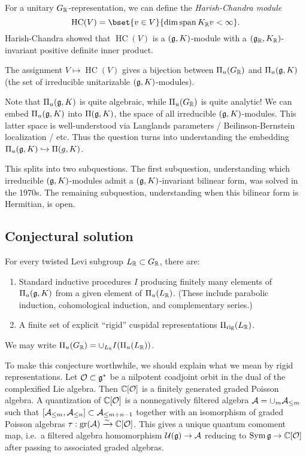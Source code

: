 \documentclass{article}
\begin{document}
For a unitary $G_{\mathbb{R}}$-representation, we can define the \emph{Harish-Chandra module}
\[
	\operatorname{HC}(V) = \bset{v \in V}{\dim \spanop K_\RR v < \infty}.
\]
Harish-Chandra showed that $\operatorname{HC}(V)$ is a $(\mathfrak{g}, K)$-module with a $(\mathfrak{g}_{\mathbb{R}}, K_{\mathbb{R}})$-invariant positive definite inner product.

\begin{thm}
	The assignment $V \mapsto \operatorname{HC}(V)$ gives a bijection between $\Pi_u(G_{\mathbb{R}})$ and $\Pi_u(\mathfrak{g}, K)$ (the set of irreducible unitarizable $(\mathfrak{g}, K)$-modules).
\end{thm}

Note that $\Pi_u(\mathfrak{g}, K)$ is quite algebraic, while $\Pi_u(G_{\mathbb{R}})$ is quite analytic!
We can embed $\Pi_u(\mathfrak{g}, K)$ into $\Pi(\mathfrak{g}, K)$, the space of all irreducible $(\mathfrak{g}, K)$-modules.
This latter space is well-understood via Langlands parameters / Beilinson-Bernstein localization / etc.
Thus the question turns into understanding the embedding $\Pi_u(\mathfrak{g}, K) \hookrightarrow \Pi(g, K)$.

This splits into two subquestions.
The first subquestion, understanding which irreducible $(\mathfrak{g}, K)$-modules admit a $(\mathfrak{g}, K)$-invariant bilinear form, was solved in the 1970s.
The remaining subquestion, understanding when this bilinear form is Hermitian, is open.

\subsection{Conjectural solution}

\begin{conj}
	For every twisted Levi subgroup $L_{\mathbb{R}} \subset G_{\mathbb{R}}$, there are:
	\begin{enumerate}
		\item Standard inductive procedures $I$ producing finitely many elements of $\Pi_u(\mathfrak{g}, K)$ from a given element of $\Pi_u(L_{\mathbb{R}})$.
			(These include parabolic induction, cohomological induction, and complementary series.)
		\item A finite set of explicit ``rigid'' cuspidal representations $\Pi_{\mathrm{rig}}(L_{\mathbb{R}})$.
	\end{enumerate}
	We may write $\Pi_u(G_{\mathbb{R}}) = \cup_{L_{\mathbb{R}}} I(\Pi_u(L_{\mathbb{R}}))$.
\end{conj}

To make this conjecture worthwhile, we should explain what we mean by rigid representations.
Let $\mathcal{O} \subset \mathfrak{g}^*$ be a nilpotent coadjoint orbit in the dual of the complexified Lie algebra.
Then $\mathbb{C}[\mathcal{O}]$ is a finitely generated graded Poisson algebra.
A quantization of $\mathbb{C}[\mathcal{O}]$ is a nonnegatively filtered algebra $\mathcal{A} = \cup_m \mathcal{A}_{\leq m}$ such that $[\mathcal{A}_{\leq m}, \mathcal{A}_{\leq n}] \subset \mathcal{A}_{\leq m + n - 1}$ together with an isomorphism of graded Poisson algebras $\tau: \operatorname{gr}(\mathcal{A}) \xrightarrow{\sim} \mathbb{C}[\mathcal{O}]$.
This gives a unique quantum comoment map, i.e.\ a filtered algebra homomorphism $\mathcal{U}(\mathfrak{g}) \to \mathcal{A}$ reducing to $\operatorname{Sym} \mathfrak{g} \to \mathbb{C}[\mathcal{O}]$ after passing to associated graded algebras.
\end{document}
